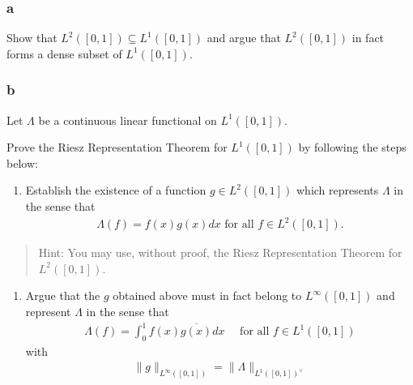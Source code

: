 \hypertarget{a-16}{%
\subsubsection{a}\label{a-16}}

Show that \(L^2([0, 1]) ⊆ L^1([0, 1])\) and argue that \(L^2([0, 1])\)
in fact forms a dense subset of \(L^1([0, 1])\).

\hypertarget{b-15}{%
\subsubsection{b}\label{b-15}}

Let \(Λ\) be a continuous linear functional on \(L^1([0, 1])\).

Prove the Riesz Representation Theorem for \(L^1([0, 1])\) by following
the steps below:

\begin{enumerate}
\def\labelenumi{\roman{enumi}.}
\tightlist
\item
  Establish the existence of a function \(g ∈ L^2([0, 1])\) which
  represents \(Λ\) in the sense that
  \begin{align*}
    Λ(f ) = f (x)g(x) dx \text{ for all } f ∈ L^2([0, 1]).
    \end{align*}
\end{enumerate}

\begin{quote}
Hint: You may use, without proof, the Riesz Representation Theorem for
\(L^2([0, 1])\).
\end{quote}

\begin{enumerate}
\def\labelenumi{\roman{enumi}.}
\setcounter{enumi}{1}
\tightlist
\item
  Argue that the \(g\) obtained above must in fact belong to
  \(L^∞([0, 1])\) and represent \(Λ\) in the sense that
  \begin{align*}
    \Lambda(f)=\int_{0}^{1} f(x) \overline{g(x)} d x \quad \text { for all } f \in L^{1}([0,1])
    \end{align*}
  with
  \begin{align*}
    \|g\|_{L^{\infty}([0,1])} = \|\Lambda\|_{L^{1}([0,1])^\vee}
    \end{align*}
\end{enumerate}

